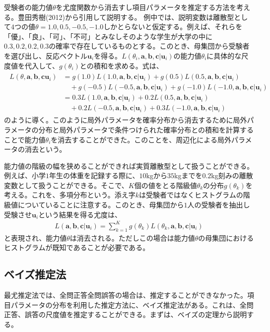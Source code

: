 \documentclass[12pt]{jarticle}
\numberwithin{equation}{subsection}
\begin{document}
受験者の能力値$\theta$を尤度関数から消去すし項目パラメータを推定する方法を考える。豊田秀樹(2012)から引用して説明する。
例中では、説明変数は離散型として$4$つの値$\displaystyle \theta = 1.0,0.5,-0.5,-1.0$しかとらないと仮定する。例えば、それらを「優」、「良」、「可」、「不可」とみなしそのような学生が大学の中に$0.3,0.2,0.2,0.3$の確率で存在しているものとする。このとき、母集団から受験者を選び出し、反応ベクトル$\boldsymbol{u}_i$を得る。$L(\theta_i,\boldsymbol{a,b,c}|\boldsymbol{u}_i)$の能力値$\theta_i$に具体的な尺度値を代入して、$g(\theta_i)$との積和を求める。式は、
\begin{align}
  \begin{split}
  \displaystyle L(\theta,\boldsymbol{a,b,c}\boldsymbol{u}_i) &= g(1.0)L(1.0,\boldsymbol{a,b,c}|\boldsymbol{u}_i) + g(0.5)L(0.5,\boldsymbol{a,b,c}|\boldsymbol{u}_i)\\&\quad + g(-0.5)L(-0.5,\boldsymbol{a,b,c}|\boldsymbol{u}_i) + g(-1.0)L(-1.0,\boldsymbol{a,b,c}|\boldsymbol{u}_i)\\ &= 0.3L(1.0,\boldsymbol{a,b,c}|\boldsymbol{u}_i) + 0.2L(0.5,\boldsymbol{a,b,c}|\boldsymbol{u}_i)\\&\quad + 0.2L(-0.5,\boldsymbol{a,b,c}|\boldsymbol{u}_i) + 0.3L(-1.0,\boldsymbol{a,b,c}|\boldsymbol{u}_i)
  \end{split}
\end{align}
のように導く。このように局外パラメータを確率分布から消去するために局外パラメータの分布と局外パラメータで条件つけられた確率分布との積和を計算することで能力値$\theta_i$を消去することができた。このことを、周辺化による局外パラメータの消去という。

能力値の階級の幅を狭めることができれば実質離散型として扱うことができる。例えば、小学$1$年生の体重を記録する際に、$10$kgから$35$kgまでを$0.2$kg刻みの離散変数として扱うことができる。そこで、$K$個の値をとる階級値$\displaystyle \theta_k$の分布$\displaystyle g(\theta_k)$を考える。これを、多項分布という。添え字$k$は受験者ではなくヒストグラムの階級値についていることに注意する。このとき、母集団から$1$人の受験者を抽出し受験させ$\displaystyle \boldsymbol{u}_i$という結果を得る尤度は、
\begin{align}
  \displaystyle  L(\boldsymbol{a,b,c}|\boldsymbol{u}_i) = \sum_{k = 1}^{K} g(\theta_k)L(\theta_k,\boldsymbol{a,b,c}| \boldsymbol{u}_i)
\end{align}
と表現され、能力値$\theta$は消去される。ただしこの場合は能力値$\theta$の母集団におけるヒストグラムが既知であることが必要である。
\subsection{ベイズ推定法}
最尤推定法では、全問正答全問誤答の場合は、推定することができなかった。項目パラメータの分布を利用した推定方法に、ベイズ推定法がある。これは、全問正答、誤答の尺度値を推定することができる。まずは、ベイズの定理から説明する。
\end{document}
